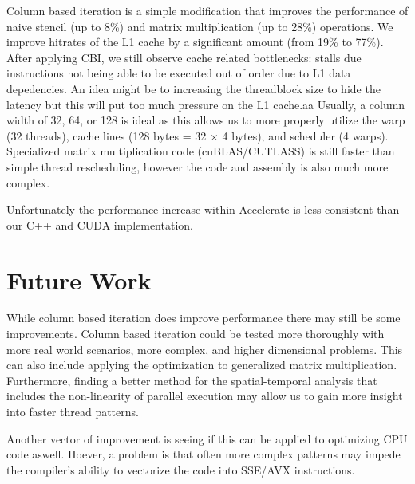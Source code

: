 Column based iteration is a simple modification that improves the performance of naive stencil (up to 8\%) and matrix multiplication (up to 28\%) operations.
We improve hitrates of the L1 cache by a significant amount (from 19\% to 77\%).
After applying CBI, we still observe cache related bottlenecks: stalls due instructions not being able to be executed out of order due to L1 data depedencies.
An idea might be to increasing the threadblock size to hide the latency but this will put too much pressure on the L1 cache.aa
Usually, a column width of 32, 64, or 128 is ideal as this allows us to more properly utilize the warp (32 threads), cache lines (128 bytes = 32 $\times$ 4 bytes), and scheduler (4 warps).
Specialized matrix multiplication code (cuBLAS/CUTLASS) is still faster than simple thread rescheduling, however the code and assembly is also much more complex.

Unfortunately the performance increase within Accelerate is less consistent than our C++ and CUDA implementation. 

\section{Future Work}
While column based iteration does improve performance there may still be some improvements.
Column based iteration could be tested more thoroughly with more real world scenarios, more complex, and higher dimensional problems.
This can also include applying the optimization to generalized matrix multiplication.
Furthermore, finding a better method for the spatial-temporal analysis that includes the non-linearity of parallel execution may allow us to gain more insight into faster thread patterns.

Another vector of improvement is seeing if this can be applied to optimizing CPU code aswell.
Hoever, a problem is that often more complex patterns may impede the compiler's ability to vectorize the code into SSE/AVX instructions.
